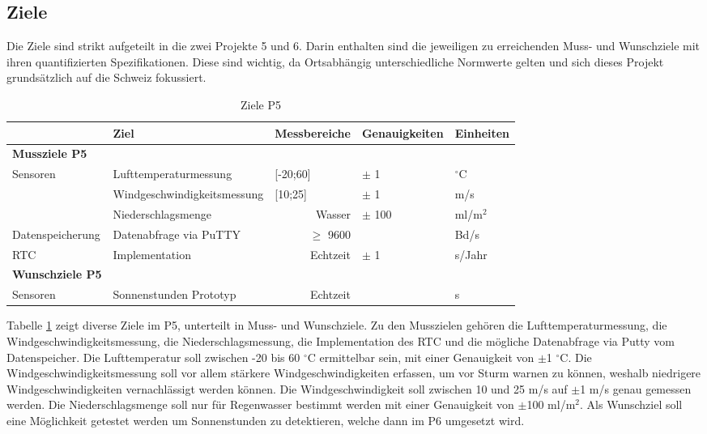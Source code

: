 \begin{landscape}
\section{Ziele}
Die Ziele sind strikt aufgeteilt in die zwei Projekte 5 und 6. Darin enthalten sind die jeweiligen zu erreichenden Muss- und Wunschziele mit ihren quantifizierten Spezifikationen. Diese sind wichtig, da Ortsabhängig unterschiedliche Normwerte gelten und sich dieses Projekt grundsätzlich auf die Schweiz fokussiert.\\
\begin{table}[htbp]
  \centering
  \caption{Ziele P5}
    \begin{tabular}{r|l|r|l|l}
          & \textbf{Ziel} & \multicolumn{1}{l|}{\textbf{Messbereiche}} & \textbf{Genauigkeiten} & \textbf{Einheiten} \\
    \toprule
    \multicolumn{1}{l}{\textbf{Mussziele P5}} & \multicolumn{1}{r}{} & \multicolumn{1}{r}{} & \multicolumn{1}{r}{} &  \\
    \toprule
    \multicolumn{1}{l|}{Sensoren} & Lufttemperaturmessung & \multicolumn{1}{l|}{[-20;60]} & $\pm$ 1 & $^\circ$C \\
\cline{2-5}          & Windgeschwindigkeitsmessung & \multicolumn{1}{l|}{[10;25]} & $\pm$ 1   & m/s \\
\cline{2-5} & Niederschlagsmenge &   Wasser    & $\pm$ 100 & ml/m$^2$ \\
    \hline
    \multicolumn{1}{l|}{Datenspeicherung} & Datenabfrage via PuTTY &   $\geq$ 9600    &       &  Bd/s\\
    \hline
    \multicolumn{1}{l|}{RTC} & Implementation &   Echtzeit    & $\pm$ 1   & s/Jahr \\
\bottomrule
\multicolumn{1}{l}{\textbf{Wunschziele P5}} & \multicolumn{1}{l}{} & \multicolumn{1}{l}{} & \multicolumn{1}{l}{} &  \\
    \toprule
    \multicolumn{1}{l|}{Sensoren} & Sonnenstunden Prototyp &   Echtzeit    &       & s \\
    \bottomrule
    \end{tabular}%
  \label{tab:ZieleP5}%
\end{table}%

Tabelle \ref{tab:ZieleP5} zeigt diverse Ziele im P5, unterteilt in Muss- und Wunschziele. Zu den Musszielen gehören die Lufttemperaturmessung, die Windgeschwindigkeitsmessung, die Niederschlagsmessung, die Implementation des RTC und die mögliche Datenabfrage via Putty vom Datenspeicher. Die Lufttemperatur soll zwischen -20 bis 60 $^\circ$C ermittelbar sein, mit einer Genauigkeit von $\pm$1 $^\circ$C. Die Windgeschwindigkeitsmessung soll vor allem stärkere Windgeschwindigkeiten erfassen, um vor Sturm warnen zu können, weshalb niedrigere Windgeschwindigkeiten vernachlässigt werden können. Die Windgeschwindigkeit soll zwischen 10 und 25 m/s auf $\pm$1 m/s genau gemessen werden. Die Niederschlagsmenge soll nur für Regenwasser bestimmt werden mit einer Genauigkeit von $\pm$100 ml/m$^2$. Als Wunschziel soll eine Möglichkeit getestet werden um Sonnenstunden zu detektieren, welche dann im P6 umgesetzt wird.\\


\end{landscape}
